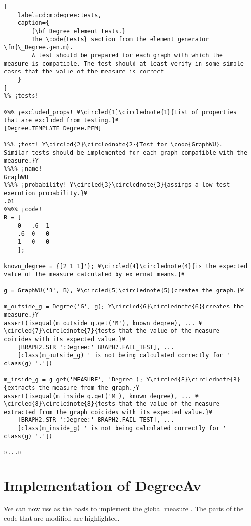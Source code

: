 \documentclass{tufte-handout}
\begin{document}
\begin{lstlisting}[
	label=cd:m:degree:tests,
	caption={
		{\bf Degree element tests.}
		The \code{tests} section from the element generator \fn{\_Degree.gen.m}.
		A test should be prepared for each graph with which the measure is compatible. The test should at least verify in some simple cases that the value of the measure is correct 
	}
]
%% ¡tests!

%%% ¡excluded_props! ¥\circled{1}\circlednote{1}{List of properties that are excluded from testing.}¥
[Degree.TEMPLATE Degree.PFM] 

%%% ¡test! ¥\circled{2}\circlednote{2}{Test for \code{GraphWU}. Similar tests should be implemented for each graph compatible with the measure.}¥
%%%% ¡name!
GraphWU
%%%% ¡probability! ¥\circled{3}\circlednote{3}{assings a low test execution probability.}¥
.01
%%%% ¡code!
B = [
    0   .6  1
    .6  0   0
    1   0   0
    ];

known_degree = {[2 1 1]'}; ¥\circled{4}\circlednote{4}{is the expected value of the measure calculated by external means.}¥

g = GraphWU('B', B); ¥\circled{5}\circlednote{5}{creates the graph.}¥

m_outside_g = Degree('G', g); ¥\circled{6}\circlednote{6}{creates the measure.}¥
assert(isequal(m_outside_g.get('M'), known_degree), ... ¥\circled{7}\circlednote{7}{tests that the value of the measure coicides with its expected value.}¥ 
    [BRAPH2.STR ':Degree:' BRAPH2.FAIL_TEST], ...
    [class(m_outside_g) ' is not being calculated correctly for ' class(g) '.'])

m_inside_g = g.get('MEASURE', 'Degree'); ¥\circled{8}\circlednote{8}{extracts the measure from the graph.}¥
assert(isequal(m_inside_g.get('M'), known_degree), ... ¥\circled{8}\circlednote{8}{tests that the value of the measure extracted from the graph coicides with its expected value.}¥
    [BRAPH2.STR ':Degree:' BRAPH2.FAIL_TEST], ...
    [class(m_inside_g) ' is not being calculated correctly for ' class(g) '.'])

¤...¤
\end{lstlisting}

\section{Implementation of DegreeAv}

We can now use  as the basis to implement the global measure .
The parts of the code that are modified are highlighted.
\end{document}

